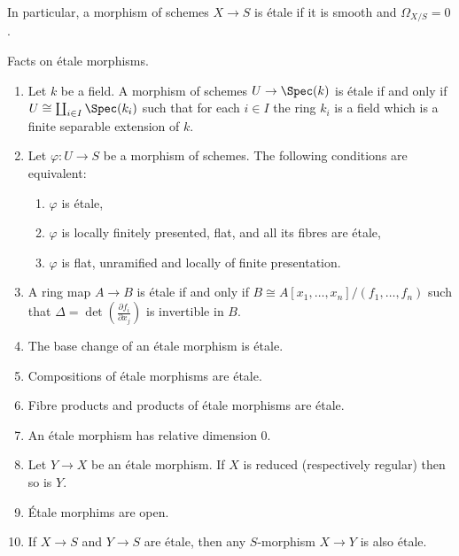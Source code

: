 \noindent
In particular, a morphism of schemes $X \to S$ is \'etale if it is smooth
and $\Omega_{X/S} = 0$.

\begin{proposition}
\label{proposition-etale-morphisms}
Facts on \'etale morphisms.
\begin{enumerate}
\item Let $k$ be a field. A morphism of schemes $U \to \Spec(k)$ is
\'etale if and only if $U \cong \coprod_{i \in I} \Spec(k_i)$
such that for each $i \in I$
the ring $k_i$ is a field which is a finite separable extension of $k$.
\item Let $\varphi : U \to S$ be a morphism of schemes. The following
conditions are equivalent:
\begin{enumerate}
\item $\varphi$ is \'etale,
\item $\varphi$ is locally finitely presented, flat, and all its fibres are
\'etale,
\item $\varphi$ is flat, unramified and locally of finite presentation.
\end{enumerate}
\item A ring map $A \to B$ is \'etale if and only if
$B \cong A[x_1, \dots, x_n]/(f_1, \dots, f_n)$
such that $\Delta = \det \left( \frac{\partial f_i}{\partial x_j} \right)$
is invertible in $B$.
\item The base change of an \'etale morphism is \'etale.
\item Compositions of \'etale morphisms are \'etale.
\item Fibre products and products of \'etale morphisms are \'etale.
\item An \'etale morphism has relative dimension 0.
\item Let $Y \to X$ be an \'etale morphism.
If $X$ is reduced (respectively regular) then so is $Y$.
\item \'Etale morphims are open.
\item If $X \to S$ and $Y \to S$ are \'etale, then any
$S$-morphism $X \to Y$ is also \'etale.
\end{enumerate}
\end{proposition}

